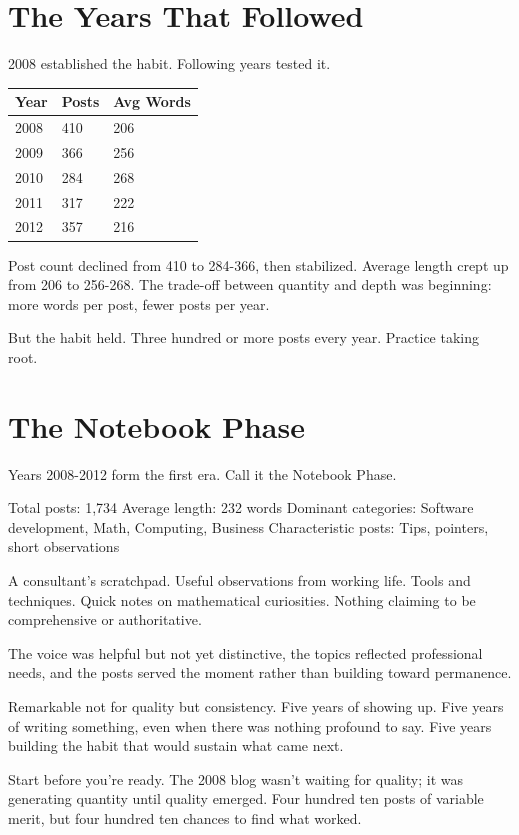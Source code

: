 \bigskip

\section*{The Years That Followed}

2008 established the habit. Following years tested it.

\begin{longtable}{p{3.00cm}p{3.00cm}p{3.00cm}}
\toprule
\textbf{Year} & \textbf{Posts} & \textbf{Avg Words} \tabularnewline
\midrule
2008 & 410 & 206 \tabularnewline
2009 & 366 & 256 \tabularnewline
2010 & 284 & 268 \tabularnewline
2011 & 317 & 222 \tabularnewline
2012 & 357 & 216 \tabularnewline
\bottomrule
\end{longtable}

Post count declined from 410 to 284-366, then stabilized. Average length crept up from 206 to 256-268. The trade-off between quantity and depth was beginning: more words per post, fewer posts per year.

But the habit held. Three hundred or more posts every year. Practice taking root.


\bigskip

\section*{The Notebook Phase}

Years 2008-2012 form the first era. Call it the Notebook Phase.

Total posts: 1,734
Average length: 232 words
Dominant categories: Software development, Math, Computing, Business
Characteristic posts: Tips, pointers, short observations

A consultant's scratchpad. Useful observations from working life. Tools and techniques. Quick notes on mathematical curiosities. Nothing claiming to be comprehensive or authoritative.

The voice was helpful but not yet distinctive, the topics reflected professional needs, and the posts served the moment rather than building toward permanence.

Remarkable not for quality but consistency. Five years of showing up. Five years of writing something, even when there was nothing profound to say. Five years building the habit that would sustain what came next.

Start before you're ready. The 2008 blog wasn't waiting for quality; it was generating quantity until quality emerged. Four hundred ten posts of variable merit, but four hundred ten chances to find what worked.


